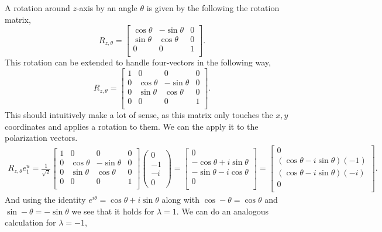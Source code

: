 \documentclass[working, oneside]{../../../Preambles/tuftebook}
\begin{document}
A rotation around $z$-axis by an angle $\theta$ is given by the following the rotation matrix,
\[
R_{z, \theta} = 
\begin{bmatrix}
    \cos\theta & -\sin \theta & 0 \\
 \sin \theta  & \cos \theta  &0  \\
    0 & 0 &1  \\
\end{bmatrix}
.\] 
This rotation can be extended to handle four-vectors in the following way,
\[
R_{z, \theta} = 
\begin{bmatrix}
    1 & 0 & 0 & 0  \\
    0 &   \cos\theta & -\sin \theta & 0 \\
    0 &\sin \theta  & \cos \theta  &0  \\
    0 &   0 & 0 &1  \\
\end{bmatrix}
.\] 
This should intuitively make a lot of sense, as this matrix only touches the $x,y$ coordinates and applies a rotation to them. We can the apply it to the polarization vectors.
\begin{align*}
    R_{z, \theta }e^{u}_1 = \frac{1}{\sqrt{2} }
\begin{bmatrix}
    1 & 0 & 0 & 0  \\
    0 &   \cos\theta & -\sin \theta & 0 \\
    0 &\sin \theta  & \cos \theta  &0  \\
    0 &   0 & 0 &1  \\
\end{bmatrix}
\left(\begin{matrix}0\\-1\\-i\\0\end{matrix}\right)
= 
\begin{bmatrix}
    0 \\
    -\cos\theta + i\sin \theta  \\
    -\sin \theta -i\cos\theta  \\
    0 \\
\end{bmatrix}
=
\begin{bmatrix}
    0 \\
    \left(   \cos\theta - i\sin \theta \right)\left( -1 \right)  \\
    \left( \cos \theta - i\sin \theta  \right) \left( -i \right)  \\
    0  \\
\end{bmatrix}
.\end{align*}
And using the identity $e^{i\theta } = \cos\theta + i \sin \theta $ along with $\cos -\theta = \cos \theta $ and $\sin -\theta = -\sin \theta $ we see that it holds for $\lambda = 1$. We can do an analogous calculation for $\lambda = -1$,
\end{document}
